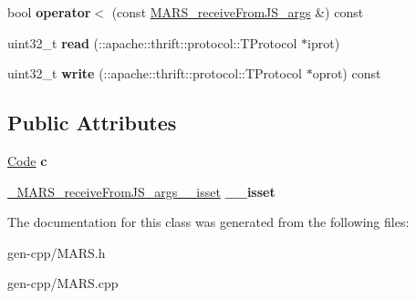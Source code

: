 \begin{DoxyCompactItemize}
\item 
\mbox{\label{classMARS_1_1MARS__receiveFromJS__args_ac4d61907c414866358feae173e024bf1}} 
bool {\bfseries operator$<$} (const \hyperlink{classMARS_1_1MARS__receiveFromJS__args}{M\+A\+R\+S\+\_\+receive\+From\+J\+S\+\_\+args} \&) const
\item 
\mbox{\label{classMARS_1_1MARS__receiveFromJS__args_aa1cd9a3bdfa2f5fb62aee69c3073e002}} 
uint32\+\_\+t {\bfseries read} (\+::apache\+::thrift\+::protocol\+::\+T\+Protocol $\ast$iprot)
\item 
\mbox{\label{classMARS_1_1MARS__receiveFromJS__args_a270415f6c01f69e38fc46678c38872e9}} 
uint32\+\_\+t {\bfseries write} (\+::apache\+::thrift\+::protocol\+::\+T\+Protocol $\ast$oprot) const
\end{DoxyCompactItemize}
\subsection*{Public Attributes}
\begin{DoxyCompactItemize}
\item 
\mbox{\label{classMARS_1_1MARS__receiveFromJS__args_a1e3e68c6380d85005ecc79323c623084}} 
\hyperlink{classMARS_1_1Code}{Code} {\bfseries c}
\item 
\mbox{\label{classMARS_1_1MARS__receiveFromJS__args_a1dba662f6b9670f4f2013f83d749dc39}} 
\hyperlink{structMARS_1_1__MARS__receiveFromJS__args____isset}{\+\_\+\+M\+A\+R\+S\+\_\+receive\+From\+J\+S\+\_\+args\+\_\+\+\_\+isset} {\bfseries \+\_\+\+\_\+isset}
\end{DoxyCompactItemize}


The documentation for this class was generated from the following files\+:\begin{DoxyCompactItemize}
\item 
gen-\/cpp/M\+A\+R\+S.\+h\item 
gen-\/cpp/M\+A\+R\+S.\+cpp\end{DoxyCompactItemize}
